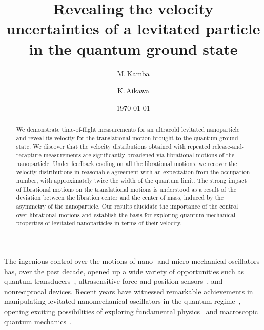 \documentclass[aps, prl, 
amsmath, showpacs, preprintnumbers, twocolumn, amssymb, amsmath, superscriptaddress]{revtex4-1}
\begin{document}
\title{Revealing the velocity uncertainties of a levitated particle in the quantum ground state}
\author{M.\,Kamba}
\author{K.\,Aikawa}


\date{\today}

\pacs{}

\begin{abstract}
We demonstrate time-of-flight measurements for an ultracold levitated nanoparticle and reveal its velocity for the translational motion brought to the quantum ground state. We discover that the velocity distributions obtained with repeated release-and-recapture measurements are significantly broadened via librational motions of the nanoparticle. Under feedback cooling on all the librational motions, we recover the velocity distributions in reasonable agreement with an expectation from the occupation number, with approximately twice the width of the quantum limit. The strong impact of librational motions on the translational motions is understood as a result of the deviation between the libration center and the center of mass, induced by the asymmetry of the nanoparticle. Our results elucidate the importance of the control over librational motions and establish the basis for exploring quantum mechanical properties of levitated nanoparticles in terms of their velocity. 
\end{abstract}

\maketitle




The ingenious control over the motions of nano- and micro-mechanical oscillators has, over the past decade, opened up a wide variety of opportunities such as quantum transducers~\cite{andrews2014bidirectional,bagci2014optical}, ultrasensitive force and position sensors~\cite{tao2014single,wilson2015measurement}, and nonreciprocal devices\cite{shen2016experimental,bernier2017nonreciprocal,peterson2017demonstration,fang2017generalized}.  
Recent years have witnessed remarkable achievements in manipulating levitated nanomechanical oscillators in the quantum regime~\cite{delic2020cooling,magrini2021real,tebbenjohanns2021quantum,kamba2022optical,piotrowski2023simultaneous,kamba2023nanoscale}, opening exciting possibilities of exploring fundamental physics~\cite{bose2017spin,monteiro2020search,manley2021searching} and macroscopic quantum mechanics~\cite{millen2020quantum,millen2020optomechanics,gonzalez2021levitodynamics}.
 
\end{document}
